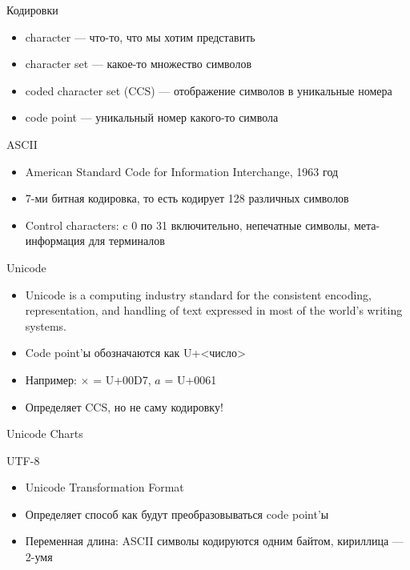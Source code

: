 \documentclass[10pt,pdf,hyperref={unicode}]{beamer}
\begin{document}
\begin{frame}{Кодировки}
\begin{itemize}
    \item character — что-то, что мы хотим представить
    \item character set — какое-то множество символов
    \item coded character set (CCS) — отображение символов в уникальные номера
    \item code point — уникальный номер какого-то символа
\end{itemize}
\end{frame}

\begin{frame}{ASCII}
\begin{itemize}
    \item American Standard Code for Information Interchange, 1963 год
    \item 7-ми битная кодировка, то есть кодирует 128 различных символов
    \item Control characters: c 0 по 31 включительно, непечатные символы, мета-информация для терминалов
\end{itemize}
\end{frame}

\begin{frame}{Unicode}
\begin{itemize}
    \item Unicode is a computing industry standard for the consistent encoding, representation, and handling of text expressed in most of the world's writing systems.
    \item Code point'ы обозначаются как U+<число>
    \item Например: $\times$ = U+00D7, $a$ = U+0061
    \item Определяет CCS, но не саму кодировку!
\end{itemize}
\end{frame}

\begin{frame}{Unicode Charts}
\center{}
\end{frame}

\begin{frame}{UTF-8}
\begin{itemize}
    \item Unicode Transformation Format
    \item Определяет способ как будут преобразовываться code point'ы
    \item Переменная длина: ASCII символы кодируются одним байтом, кириллица — 2-умя
\end{itemize}
\end{frame}
\end{document}
